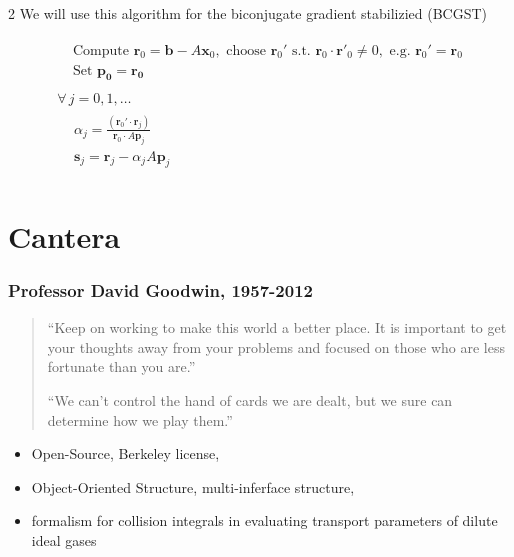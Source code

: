 \documentclass[10pt]{amsart}
\begin{document}
\begin{multicols*}{2}
We will use this algorithm for the biconjugate gradient stabilizied (BCGST)

\begin{equation}
\begin{gathered}
	\begin{aligned}
		& \text{ Compute } \mathbf{r}_0 = \mathbf{b} - A \mathbf{x}_0, \text{ choose } \mathbf{r}_0' \text{ s.t. } \mathbf{r}_0 \cdot \mathbf{r}'_0 \neq 0, \text{ e.g. } \mathbf{r}_0' = \mathbf{r}_0 \\
		& \text{ Set } \mathbf{p_0} = \mathbf{r_0}
	\end{aligned} \\
\begin{gathered}
	\forall \, j = 0, 1, \dots \\
	\begin{aligned}
		& \alpha_j = \frac{ (\mathbf{r}_0' \cdot \mathbf{r}_j) }{ \mathbf{r}_0 \cdot A \mathbf{p}_j } \\
		& \mathbf{s}_j = \mathbf{r}_j - \alpha_j A \mathbf{p}_j
	\end{aligned}
\end{gathered}
\end{gathered}
\end{equation}

\part{Cantera}

\section{Professor David Goodwin, 1957-2012}

\begin{quotation}
``Keep on working to make this world a better place. It is important to get your thoughts away from your problems and focused on those who are less fortunate than you are.''

``We can't control the hand of cards we are dealt, but we sure can determine how we play them.''
\end{quotation}

\begin{itemize}
  \item Open-Source, Berkeley license,
  \item Object-Oriented Structure, multi-inferface structure, 
  \item formalism for collision integrals in evaluating transport parameters of dilute ideal gases
\end{itemize}


\end{multicols*}
\end{document}
